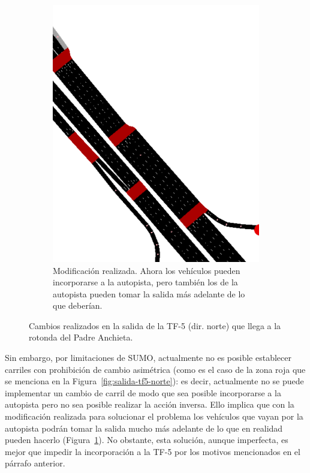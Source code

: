 \begin{figure}[ht]
\begin{subfigure}[t]{0.48\textwidth}
      \includegraphics[width=\textwidth]{report/images/netedit.-tf5-norte-bien.png}
      \caption{Modificación realizada. Ahora los vehículos pueden incorporarse a la autopista, pero también los de la autopista pueden tomar la salida más adelante de lo que deberían.}
      \label{fig:netedit-tf5-norte-bien}
    \end{subfigure}%
    \caption{Cambios realizados en la salida de la TF-5 (dir. norte) que llega a la rotonda del Padre Anchieta.}
    \label{fig:netedit-tf5-problema}
\end{figure}

Sin embargo, por limitaciones de SUMO, actualmente no es posible establecer carriles con prohibición de cambio asimétrica (como es el caso de la zona roja que se menciona en la Figura~\ref{fig:salida-tf5-norte}): es decir, actualmente no se puede implementar un cambio de carril de modo que sea posible incorporarse a la autopista pero no sea posible realizar la acción inversa. Ello implica que con la modificación realizada para solucionar el problema los vehículos que vayan por la autopista podrán tomar la salida mucho más adelante de lo que en realidad pueden hacerlo (Figura~\ref{fig:netedit-tf5-norte-bien}). No obstante, esta solución, aunque imperfecta, es mejor que impedir la incorporación a la TF-5 por los motivos mencionados en el párrafo anterior.

